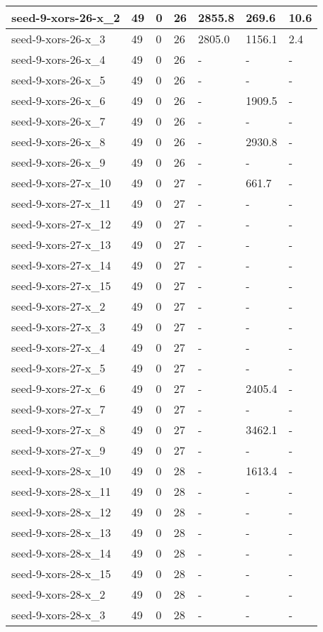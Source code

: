 \begin{scriptsize}
\begin{longtable}{|p{5cm}|l|l|l|l|l|l|}
seed-9-xors-26-x\_2&49&0&26&2855.8&269.6&10.6 \\ \hline 
seed-9-xors-26-x\_3&49&0&26&2805.0&1156.1&2.4 \\ \hline 
seed-9-xors-26-x\_4&49&0&26&-&-&- \\ \hline 
seed-9-xors-26-x\_5&49&0&26&-&-&- \\ \hline 
seed-9-xors-26-x\_6&49&0&26&-&1909.5&- \\ \hline 
seed-9-xors-26-x\_7&49&0&26&-&-&- \\ \hline 
seed-9-xors-26-x\_8&49&0&26&-&2930.8&- \\ \hline 
seed-9-xors-26-x\_9&49&0&26&-&-&- \\ \hline 
seed-9-xors-27-x\_10&49&0&27&-&661.7&- \\ \hline 
seed-9-xors-27-x\_11&49&0&27&-&-&- \\ \hline 
seed-9-xors-27-x\_12&49&0&27&-&-&- \\ \hline 
seed-9-xors-27-x\_13&49&0&27&-&-&- \\ \hline 
seed-9-xors-27-x\_14&49&0&27&-&-&- \\ \hline 
seed-9-xors-27-x\_15&49&0&27&-&-&- \\ \hline 
seed-9-xors-27-x\_2&49&0&27&-&-&- \\ \hline 
seed-9-xors-27-x\_3&49&0&27&-&-&- \\ \hline 
seed-9-xors-27-x\_4&49&0&27&-&-&- \\ \hline 
seed-9-xors-27-x\_5&49&0&27&-&-&- \\ \hline 
seed-9-xors-27-x\_6&49&0&27&-&2405.4&- \\ \hline 
seed-9-xors-27-x\_7&49&0&27&-&-&- \\ \hline 
seed-9-xors-27-x\_8&49&0&27&-&3462.1&- \\ \hline 
seed-9-xors-27-x\_9&49&0&27&-&-&- \\ \hline 
seed-9-xors-28-x\_10&49&0&28&-&1613.4&- \\ \hline 
seed-9-xors-28-x\_11&49&0&28&-&-&- \\ \hline 
seed-9-xors-28-x\_12&49&0&28&-&-&- \\ \hline 
seed-9-xors-28-x\_13&49&0&28&-&-&- \\ \hline 
seed-9-xors-28-x\_14&49&0&28&-&-&- \\ \hline 
seed-9-xors-28-x\_15&49&0&28&-&-&- \\ \hline 
seed-9-xors-28-x\_2&49&0&28&-&-&- \\ \hline 
seed-9-xors-28-x\_3&49&0&28&-&-&- \\ \hline 

\end{longtable}
\end{scriptsize}
